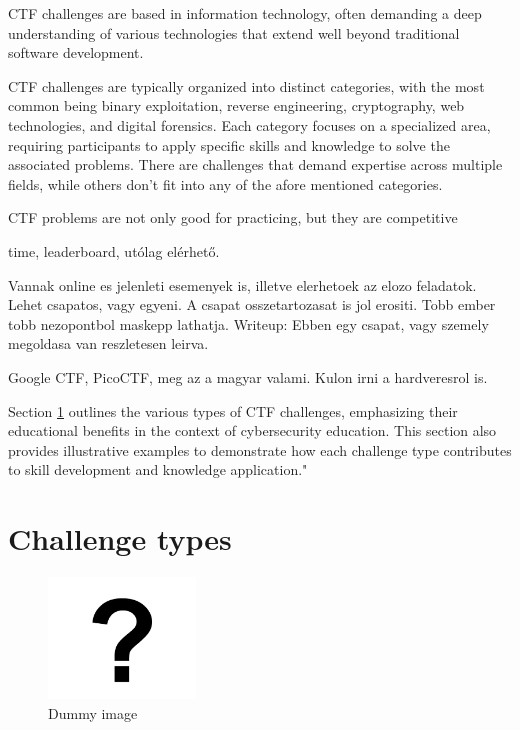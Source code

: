 \documentclass[conference]{IEEEtran}
\begin{document}
CTF challenges are based in information technology, often demanding a deep
understanding of various technologies that extend well beyond traditional
software development.

CTF challenges are typically organized into distinct categories, with the most
common being binary exploitation, reverse engineering, cryptography, web
technologies, and digital forensics. Each category focuses on a specialized
area, requiring participants to apply specific skills and knowledge to solve
the associated problems. There are challenges that demand expertise across multiple
fields, while others don't fit into any of the afore mentioned categories.

CTF problems are not only good for practicing, but they are competitive

time, leaderboard, utólag elérhető.

Vannak online es jelenleti esemenyek
is, illetve elerhetoek az elozo feladatok. Lehet csapatos, vagy egyeni.
A csapat osszetartozasat is jol erositi. Tobb ember tobb nezopontbol maskepp lathatja.
Writeup: Ebben egy csapat, vagy szemely megoldasa van reszletesen leirva.

Google CTF, PicoCTF, meg az a magyar valami. Kulon irni a hardveresrol is.

Section \ref{sec-challenge-types} outlines the various types of CTF challenges,
emphasizing their educational benefits in the context of cybersecurity
education. This section also provides illustrative examples to demonstrate how
each challenge type contributes to skill development and knowledge
application."

\cite{gyorok2014}
\cite{safar2019}
\cite{beszedes2023}

\cite{rahman2020}

\cite{schneider2013}

\cite{lhee2003}



\section{Challenge types}
\label{sec-challenge-types}

\begin{figure}[htbp]
	\centering
	\includegraphics[width=0.35\textwidth]{fig/dummy.png}
	\caption{Dummy image}
	\label{fig-dummy}
\end{figure}
\end{document}
